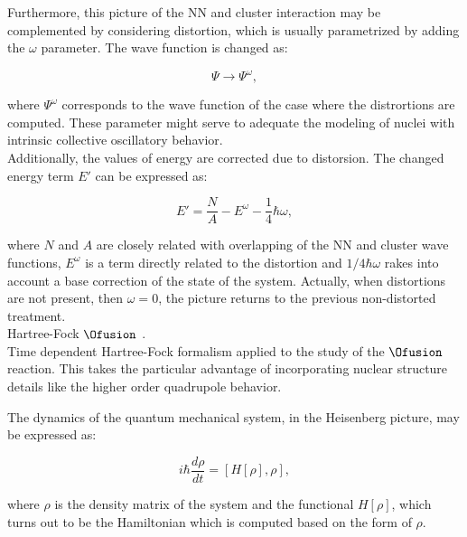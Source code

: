 \documentclass[openany]{book}
\begin{document}
Furthermore, this picture of the NN and cluster interaction may be complemented by considering distortion, which is usually parametrized by adding the $\omega$ parameter. The wave function is changed as: 

\begin{equation} 	\label{eq:micro_multicluster_distortion}
	\Psi \rightarrow \Psi^{\omega},
\end{equation}

where $ \Psi^{\omega}$ corresponds to the wave function of the case where the distrortions are computed. These parameter might serve to adequate the modeling of nuclei with intrinsic collective oscillatory behavior. \\

Additionally, the values of energy are corrected due to distorsion. The changed energy term $E'$ can be expressed as: 

\begin{equation}\label{eq:micro_multicluster_distortion_energy}
	E' = \frac{N}{A} - E^{\omega} - \frac{1}{4} \hbar \omega, 
\end{equation}

where $N$ and $A$ are closely related with overlapping of the NN and cluster wave functions, $E^{\omega}$ is a term directly related to the distortion and $1/4 \hbar \omega$ rakes into account a base correction of the state of the system. Actually, when distortions are not present, then $\omega = 0$, the picture returns to the previous non-distorted treatment. \\ 

Hartree-Fock $\Ofusion$ \cite{simenel_keser_umar_oberacker_2013}. \\

Time dependent Hartree-Fock formalism applied to the study of the $\Ofusion$ reaction. This takes the particular advantage of incorporating nuclear structure details like the higher order quadrupole behavior.

The dynamics of the quantum mechanical system, in the Heisenberg picture, may be expressed as:  

\begin{equation}\label{micro_TDHF_evolution}
	i\hbar \frac{d\rho}{dt} = [H[\rho], \rho],
\end{equation}

where $\rho$ is the density matrix of the system and the functional $H[\rho]$, which turns out to be the Hamiltonian which is computed based on the form of $\rho$. \\
\end{document}
